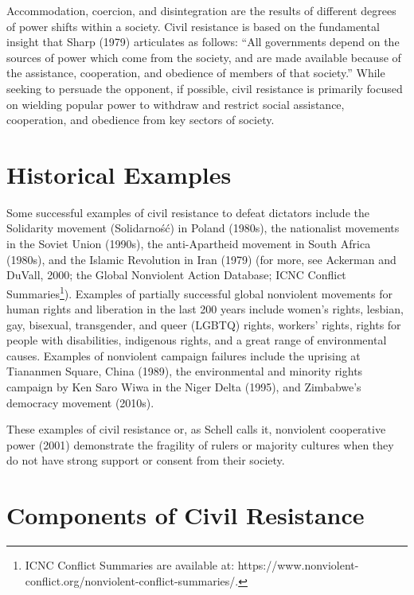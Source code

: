 \documentclass[twoside,a4paper,12pt,fleqn,openany]{extbook}
\begin{document}
Accommodation, coercion, and disintegration are the results of different degrees of power shifts within a society. Civil resistance is based on the fundamental insight that Sharp (1979) articulates as follows: “All governments depend on the sources of power which come from the society, and are made available because of the assistance, cooperation, and obedience of members of that society.” While seeking to persuade the opponent, if possible, civil resistance is primarily focused on wielding popular power to withdraw and restrict social assistance, cooperation, and obedience from key sectors of society.

\section*{Historical Examples}

Some successful examples of civil resistance to defeat dictators include the Solidarity movement (Solidarność) in Poland (1980s), the nationalist movements in the Soviet Union (1990s), the anti-Apartheid movement in South Africa (1980s), and the Islamic Revolution in Iran (1979) (for more, see Ackerman and DuVall, 2000; the Global Nonviolent Action Database; ICNC Conflict Summaries\footnote{ICNC Conflict Summaries are available at: https://www.nonviolent-conflict.org/nonviolent-conflict-summaries/.}). Examples of partially successful global nonviolent movements for human rights and liberation in the last 200 years include women’s rights, lesbian, gay, bisexual, transgender, and queer (LGBTQ) rights, workers’ rights, rights for people with disabilities, indigenous rights, and a great range of environmental causes. Examples of nonviolent campaign failures include the uprising at Tiananmen Square, China (1989), the environmental and minority rights campaign by Ken Saro Wiwa in the Niger Delta (1995), and Zimbabwe’s democracy movement (2010s).

These examples of civil resistance or, as Schell calls it, nonviolent cooperative power (2001) demonstrate the fragility of rulers or majority cultures when they do not have strong support or consent from their society.

\section*{Components of Civil Resistance}
\end{document}
